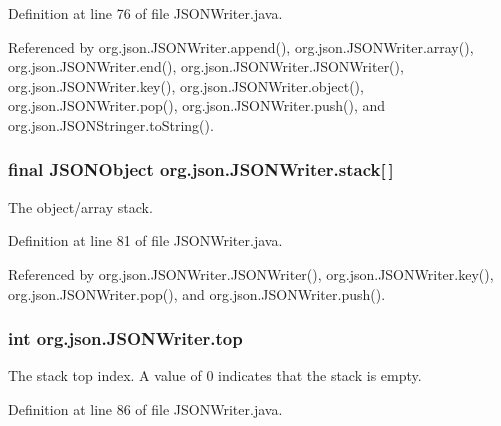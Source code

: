 Definition at line 76 of file J\-S\-O\-N\-Writer.\-java.



Referenced by org.\-json.\-J\-S\-O\-N\-Writer.\-append(), org.\-json.\-J\-S\-O\-N\-Writer.\-array(), org.\-json.\-J\-S\-O\-N\-Writer.\-end(), org.\-json.\-J\-S\-O\-N\-Writer.\-J\-S\-O\-N\-Writer(), org.\-json.\-J\-S\-O\-N\-Writer.\-key(), org.\-json.\-J\-S\-O\-N\-Writer.\-object(), org.\-json.\-J\-S\-O\-N\-Writer.\-pop(), org.\-json.\-J\-S\-O\-N\-Writer.\-push(), and org.\-json.\-J\-S\-O\-N\-Stringer.\-to\-String().

\hypertarget{classorg_1_1json_1_1_j_s_o_n_writer_a06c3b64f8f98ba2bb2a3f57b1c5b328f}{
\subsubsection[{stack}]{\setlength{\rightskip}{0pt plus 5cm}final {\bf J\-S\-O\-N\-Object} org.\-json.\-J\-S\-O\-N\-Writer.\-stack\mbox{[}$\,$\mbox{]}\hspace{0.3cm}{\ttfamily [private]}}}\label{classorg_1_1json_1_1_j_s_o_n_writer_a06c3b64f8f98ba2bb2a3f57b1c5b328f}
The object/array stack. 

Definition at line 81 of file J\-S\-O\-N\-Writer.\-java.



Referenced by org.\-json.\-J\-S\-O\-N\-Writer.\-J\-S\-O\-N\-Writer(), org.\-json.\-J\-S\-O\-N\-Writer.\-key(), org.\-json.\-J\-S\-O\-N\-Writer.\-pop(), and org.\-json.\-J\-S\-O\-N\-Writer.\-push().

\hypertarget{classorg_1_1json_1_1_j_s_o_n_writer_a2da85e29823056f58034b8723b7da082}{
\subsubsection[{top}]{\setlength{\rightskip}{0pt plus 5cm}int org.\-json.\-J\-S\-O\-N\-Writer.\-top\hspace{0.3cm}{\ttfamily [private]}}}\label{classorg_1_1json_1_1_j_s_o_n_writer_a2da85e29823056f58034b8723b7da082}
The stack top index. A value of 0 indicates that the stack is empty. 

Definition at line 86 of file J\-S\-O\-N\-Writer.\-java.



